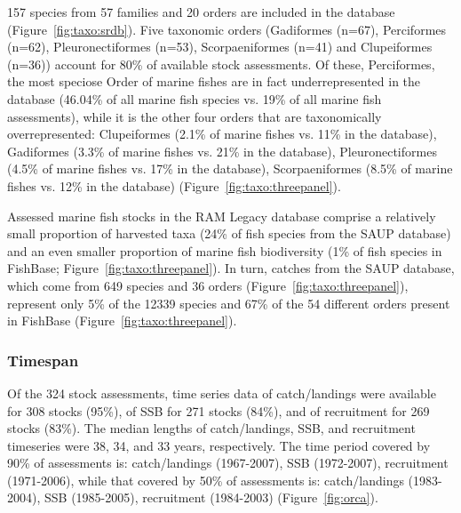 157 species from
57 families and 20
orders are included in the database (Figure~\ref{fig:taxo:srdb}). Five
taxonomic orders (Gadiformes (n=67),
Perciformes (n=62), Pleuronectiformes (n=53),
Scorpaeniformes (n=41) and Clupeiformes (n=36)) account for
80\% of available stock assessments.  Of these, Perciformes, the
most speciose Order of marine fishes are in fact underrepresented in
the database (46.04\% of all marine fish species vs.  19\%
of all marine fish assessments), while it is the other four orders
that are taxonomically overrepresented: Clupeiformes (2.1\% of marine
fishes vs.  11\% in the database), Gadiformes (3.3\% of marine fishes
vs.  21\% in the database), Pleuronectiformes (4.5\% of marine fishes
vs.  17\% in the database), Scorpaeniformes (8.5\% of marine fishes
vs. 12\% in the database) (Figure~\ref{fig:taxo:threepanel}).

Assessed marine fish stocks in the RAM Legacy database comprise a
relatively small proportion of harvested taxa (24\% of fish species
from the SAUP database) and an even smaller proportion of marine fish
biodiversity (1\% of fish species in FishBase;
Figure~\ref{fig:taxo:threepanel}). In turn, catches from the SAUP
database, which come from 649 species and
36 orders (Figure~\ref{fig:taxo:threepanel}),
represent only 5\% of the 12339 species and 67\% of
the 54 different orders present in FishBase
(Figure~\ref{fig:taxo:threepanel}).




\subsubsection*{Timespan }

Of the 324 stock assessments, time series data of
catch/landings were available for 308 stocks (95\%),
of SSB for 271 stocks (84\%), and of recruitment for
269 stocks (83\%).  The median lengths of
catch/landings, SSB, and recruitment timeseries were
38, 34, and 33 years,
respectively.  The time period covered by 90\%
of assessments is: catch/landings (1967-2007), SSB (1972-2007), recruitment
(1971-2006), while that covered by 50\% of assessments is: catch/landings
(1983-2004), SSB (1985-2005), recruitment (1984-2003) (Figure~\ref{fig:orca}).

